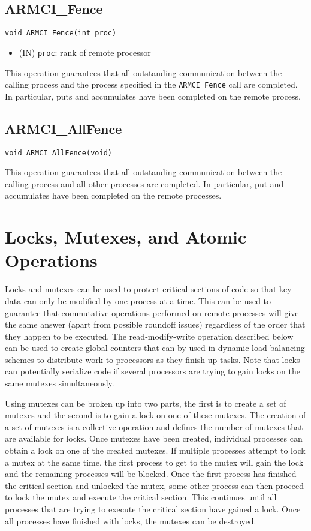 \documentclass[12pt]{article}
\begin{document}
\subsection{ARMCI\_Fence}
\begin{verbatim}
void ARMCI_Fence(int proc)
\end{verbatim}
\begin{itemize}
\item (IN) \texttt{proc}: rank of remote processor
\end{itemize}
This operation guarantees that all outstanding communication between the calling
process and the process specified in the \texttt{ARMCI\_Fence} call are completed. In
particular, puts and accumulates have been completed on the remote process.

\subsection{ARMCI\_AllFence}
\begin{verbatim}
void ARMCI_AllFence(void)
\end{verbatim}
This operation guarantees that all outstanding communication between the calling
process and all other processes are completed. In particular, put and
accumulates have been completed on the remote processes.

\section{Locks, Mutexes, and Atomic Operations}
Locks and mutexes can be used to protect critical sections of code so that key
data can only be modified by one process at a time. This can be used to
guarantee that commutative operations performed on remote processes will give
the same answer (apart from possible roundoff issues) regardless of the order
that they happen to be executed. The read-modify-write operation described below
can be used to create global counters that can by used in dynamic load balancing
schemes to distribute work to processors as they finish up tasks. Note that
locks can potentially serialize code if several processors are trying to gain
locks on the same mutexes simultaneously.

Using mutexes can be broken up into two parts, the first is to create a set of
mutexes and the second is to gain a lock on one of these mutexes. The creation
of a set of mutexes is a collective operation and defines the number of mutexes
that are available for locks. Once mutexes have been created, individual
processes can obtain a lock on one of the created mutexes. If multiple processes
attempt to lock a mutex at the same time, the first process to get to the mutex
will gain the lock and the remaining processes will be blocked. Once the first
process has finished the critical section and unlocked the mutex, some other
process can then proceed to lock the mutex and execute the critical section.
This continues until all processes that are trying to execute the critical
section have gained a lock. Once all processes have finished with locks, the
mutexes can be destroyed.
\end{document}
